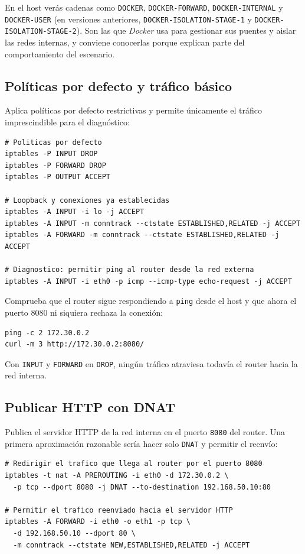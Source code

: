 \documentclass[a4paper]{article}
\begin{document}
En el host verás cadenas como \texttt{DOCKER}, \texttt{DOCKER-FORWARD}, \texttt{DOCKER-INTERNAL} y \texttt{DOCKER-USER} (en versiones anteriores, \texttt{DOCKER-ISOLATION-STAGE-1} y \texttt{DOCKER-ISOLATION-STAGE-2}). Son las que \emph{Docker} usa para gestionar sus puentes y aislar las redes internas, y conviene conocerlas porque explican parte del comportamiento del escenario.
\subsection{Políticas por defecto y tráfico básico}
\label{sec:orgafd5375}

Aplica políticas por defecto restrictivas y permite únicamente el tráfico imprescindible para el diagnóstico:

\begin{verbatim}
# Politicas por defecto
iptables -P INPUT DROP
iptables -P FORWARD DROP
iptables -P OUTPUT ACCEPT

# Loopback y conexiones ya establecidas
iptables -A INPUT -i lo -j ACCEPT
iptables -A INPUT -m conntrack --ctstate ESTABLISHED,RELATED -j ACCEPT
iptables -A FORWARD -m conntrack --ctstate ESTABLISHED,RELATED -j ACCEPT

# Diagnostico: permitir ping al router desde la red externa
iptables -A INPUT -i eth0 -p icmp --icmp-type echo-request -j ACCEPT
\end{verbatim}

Comprueba que el router sigue respondiendo a \texttt{ping} desde el host y que ahora el puerto 8080 ni siquiera rechaza la conexión:

\begin{verbatim}
ping -c 2 172.30.0.2
curl -m 3 http://172.30.0.2:8080/
\end{verbatim}

Con \texttt{INPUT} y \texttt{FORWARD} en \texttt{DROP}, ningún tráfico atraviesa todavía el router hacia la red interna.
\subsection{Publicar HTTP con DNAT}
\label{sec:org1232191}

Publica el servidor HTTP de la red interna en el puerto \texttt{8080} del router. Una primera aproximación razonable sería hacer solo \texttt{DNAT} y permitir el reenvío:

\begin{verbatim}
# Redirigir el trafico que llega al router por el puerto 8080
iptables -t nat -A PREROUTING -i eth0 -d 172.30.0.2 \
  -p tcp --dport 8080 -j DNAT --to-destination 192.168.50.10:80

# Permitir el trafico reenviado hacia el servidor HTTP
iptables -A FORWARD -i eth0 -o eth1 -p tcp \
  -d 192.168.50.10 --dport 80 \
  -m conntrack --ctstate NEW,ESTABLISHED,RELATED -j ACCEPT
\end{verbatim}
\end{document}
